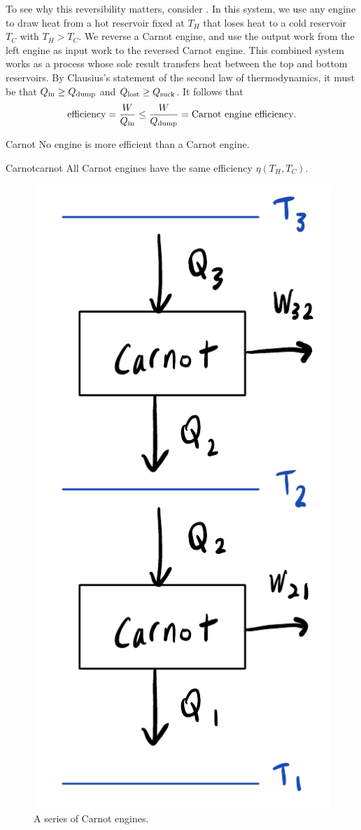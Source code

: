 To see why this reversibility matters, consider . In this
system, we use any engine to draw heat from a hot reservoir fixed at
$T_H$ that loses heat to a cold reservoir $T_C$ with $T_H>T_C$. We reverse a Carnot engine,
and use the output work from the left engine as input work to the reversed
Carnot engine. This combined system works as a process whose sole result 
transfers heat between the top and bottom reservoirs. By Clausius's statement 
of the second law of thermodynamics, it must be that $Q_{\text{in}}\geq Q_{\text{dump}}$ and
$Q_{\text{lost}}\geq Q_{\text{suck}}$. It follows that
\begin{equation}
\text{efficiency}=\frac{W}{Q_{\text{in}}}\leq\frac{W}{Q_{\text{dump}}}=\text{Carnot engine
efficiency}.
\end{equation}

\begin{theorem}{Carnot}{}
No engine is more efficient than a Carnot engine.
\end{theorem}

\begin{corollary}{Carnot}{carnot}
All Carnot engines have the same efficiency $\eta(T_H,T_C).$
\end{corollary}

\begin{figure}
\centering
\includegraphics[width=0.6\linewidth]{figs/carnotSeries.pdf}
\caption{A series of Carnot engines.}
\label{fig:carnotSeries}
\end{figure}

